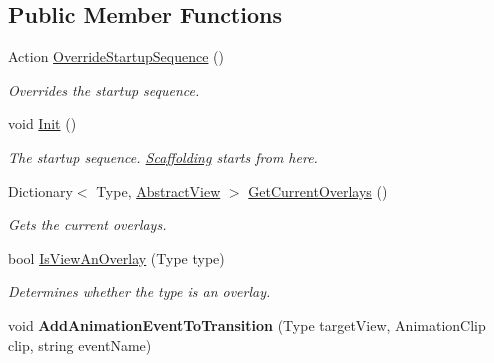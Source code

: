 \subsection*{Public Member Functions}
\begin{DoxyCompactItemize}
\item 
Action \hyperlink{class_scaffolding_1_1_view_manager_a8b9e5f3a4043a28c2b7d123724ae87b4}{Override\-Startup\-Sequence} ()
\begin{DoxyCompactList}\small\item\em Overrides the startup sequence. \end{DoxyCompactList}\item 
void \hyperlink{class_scaffolding_1_1_view_manager_a8da654dc78dfd8839c7680315bedd382}{Init} ()
\begin{DoxyCompactList}\small\item\em The startup sequence. \hyperlink{namespace_scaffolding}{Scaffolding} starts from here. \end{DoxyCompactList}\item 
Dictionary$<$ Type, \hyperlink{class_scaffolding_1_1_abstract_view}{Abstract\-View} $>$ \hyperlink{class_scaffolding_1_1_view_manager_a5674ccdc20f2afe33e0f55838fc05f27}{Get\-Current\-Overlays} ()
\begin{DoxyCompactList}\small\item\em Gets the current overlays. \end{DoxyCompactList}\item 
bool \hyperlink{class_scaffolding_1_1_view_manager_a85f6fe3eff8b8fabfc846ba3fc109a4a}{Is\-View\-An\-Overlay} (Type type)
\begin{DoxyCompactList}\small\item\em Determines whether the type is an overlay. \end{DoxyCompactList}\item 
\hypertarget{class_scaffolding_1_1_view_manager_a2c7fd84060667b998d66a67568853a03}{void {\bfseries Add\-Animation\-Event\-To\-Transition} (Type target\-View, Animation\-Clip clip, string event\-Name)}\label{class_scaffolding_1_1_view_manager_a2c7fd84060667b998d66a67568853a03}


\end{DoxyCompactItemize}
